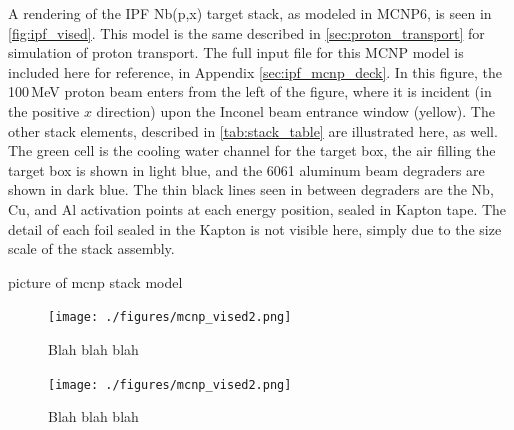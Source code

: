 A rendering of the IPF Nb(p,x) target stack, as modeled in MCNP6, is seen in \autoref{fig:ipf_vised}.
This model is the same described in \autoref{sec:proton_transport} for simulation of proton transport.
The full input file for this MCNP model is included here for reference, in Appendix \ref{sec:ipf_mcnp_deck}.
In this figure, the 100\,MeV proton beam enters from the left of the figure, where it is incident (in the positive $x$ direction) upon the Inconel beam entrance window (yellow).
The other stack elements, described in  \autoref{tab:stack_table} are illustrated here, as well.
The green cell is the cooling water channel for the target box, the air filling the target box is shown in light blue, and the 6061 aluminum beam degraders are shown in dark blue.  
The thin black lines seen in between degraders are the Nb, Cu, and Al activation points at each energy position, sealed in Kapton tape. 
The detail of each foil sealed in the Kapton is not visible here, simply due to the size scale of the stack assembly.





picture of mcnp stack model


\begin{figure}
 \centering
 \texttt{[image: ./figures/mcnp\_vised2.png]}
 \caption{Blah blah blah
}
 \label{fig:fe_vised_55}
\end{figure}


\begin{figure}
 \centering
 \texttt{[image: ./figures/mcnp\_vised2.png]}
\caption{Blah blah blah
}
 \label{fig:fe_vised_25}
\end{figure}





